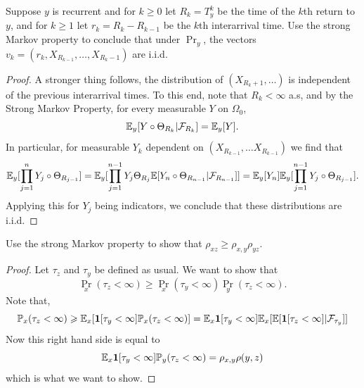 \begin{exercise} [5.3.1]
    Suppose $y$ is recurrent and for $k \geq 0$ let $R_k = T_y^k$ be 
    the time of the $k$th return to $y$, and for $k \geq 1$ let 
    $r_k = R_k - R_{k-1}$ be the $k$th interarrival time. 
    Use the strong Markov property to conclude that under $\Pr_y$,
    the vectors $v_k = (r_k, X_{R_{k-1}}, \dots, X_{R_{k} - 1})$ are i.i.d.
\end{exercise}

\begin{proof}
    A stronger thing follows, the distribution of $(X_{R_k + 1}, \dots)$
    is independent of the previous interarrival times. To this end, 
    note that $R_k < \infty$ a.s, and by the Strong Markov Property, 
    for every measurable $Y$ on $\Omega_0$, 
    \[
        \mathbb{E}_y[Y \circ \Theta_{R_k} | \mathcal{F}_{R_k}] = \mathbb{E}_{y}[Y].
    \]
    In particular, for measurable $Y_k$ dependent on $(X_{R_{k-1}}, \dots X_{R_{k - 1}})$
    we find that 
    \[
        \mathbb{E}_y[\prod_{j=1}^n Y_j \circ \Theta_{R_{j-1}}] 
            = \mathbb{E}_y[\prod_{j = 1}^{n-1}Y_j \Theta_{R_j} \mathbb{E}[Y_n \circ \Theta_{R_{n-1}} | \mathcal{F}_{R_{n-1}}]]
                = \mathbb{E}_y[Y_n] \mathbb{E}_y[\prod_{j=1}^{n-1} Y_j \circ \Theta_{R_{j-1}}].
    \]
    Applying this for $Y_j$ being indicators, we conclude that these distributions 
    are i.i.d.
\end{proof}

\begin{exercise}[5.3.2]
    Use the strong Markov property to show that $\rho_{xz} \geq \rho_{x,y}\rho_{yz}$.
\end{exercise}
\begin{proof}
    Let $\tau_z$ and $\tau_y$ be defined as usual. We want to show that 
    \[
    \Pr_x(\tau_z < \infty) \geq \Pr_x(\tau_y < \infty)\Pr_y(\tau_z < \infty).
    \]
    Note that,
    \[
        \mathbb{P}_x(\tau_z < \infty) \geqslant \mathbb{E}_x[\bm{1}[\tau_y < \infty]\mathbb{P}_x(\tau_z < \infty)] 
        = \mathbb{E}_x \bm{1}[\tau_y < \infty]\mathbb{E}_x[\mathbb{E}[\bm{1}[\tau_z < \infty]| \mathcal{F}_{\tau_y}]]
    \]
    Now this right hand side is equal to
    \[
        \mathbb{E}_x \bm{1}[\tau_y < \infty]\mathbb{P}_y(\tau_z < \infty) = \rho_{x,y}\rho(y,z)
    \]
    which is what we want to show.
\end{proof}

